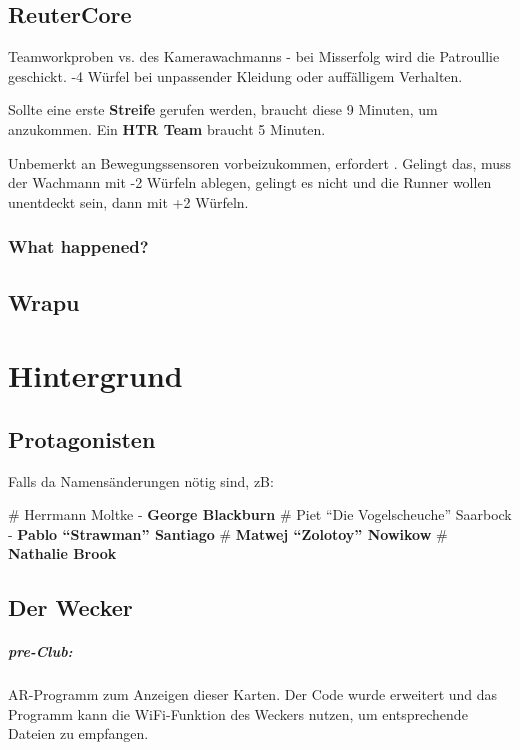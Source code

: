 \subsection{ReuterCore}

Teamworkproben  vs.  des Kamerawachmanns - bei Misserfolg wird die Patroullie geschickt. -4 Würfel bei unpassender Kleidung oder auffälligem Verhalten.

Sollte eine erste \textbf{Streife} gerufen werden, braucht diese 9 Minuten, um anzukommen. Ein \textbf{HTR Team} braucht 5 Minuten.

Unbemerkt an Bewegungssensoren vorbeizukommen, erfordert . Gelingt das, muss der Wachmann  mit -2 Würfeln ablegen, gelingt es nicht und die Runner wollen unentdeckt sein, dann mit +2 Würfeln.

\subsubsection{What happened?}


\subsection{Wrapu}


\clearpage
\section{Hintergrund}

\subsection{Protagonisten}

Falls da Namensänderungen nötig sind, zB:

\begin{easylist}
    # Herrmann Moltke - \textbf{George Blackburn}
    # Piet ``Die Vogelscheuche'' Saarbock - \textbf{Pablo ``Strawman'' Santiago}
    # \textbf{Matwej ``Zolotoy'' Nowikow}
    # \textbf{Nathalie Brook}
\end{easylist}



\subsection{Der Wecker}

\subparagraph{pre-Club:} AR-Programm zum Anzeigen dieser Karten.  Der Code wurde erweitert und das Programm kann die WiFi-Funktion des Weckers nutzen, um entsprechende Dateien zu empfangen.

